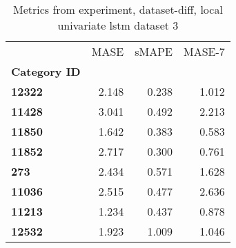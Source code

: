 \begin{table}[h]
\centering
\caption{Metrics from experiment, dataset-diff, local univariate lstm dataset 3}
\label{table:local-univariate-lstm-dataset-3-dataset-diff}
\begin{tabular}{lrrr}
\toprule
{} &   MASE &  sMAPE &  MASE-7 \\
\textbf{Category ID} &        &        &         \\
\midrule
\textbf{12322      } &  2.148 &  0.238 &   1.012 \\
\textbf{11428      } &  3.041 &  0.492 &   2.213 \\
\textbf{11850      } &  1.642 &  0.383 &   0.583 \\
\textbf{11852      } &  2.717 &  0.300 &   0.761 \\
\textbf{273        } &  2.434 &  0.571 &   1.628 \\
\textbf{11036      } &  2.515 &  0.477 &   2.636 \\
\textbf{11213      } &  1.234 &  0.437 &   0.878 \\
\textbf{12532      } &  1.923 &  1.009 &   1.046 \\
\bottomrule
\end{tabular}
\end{table}
